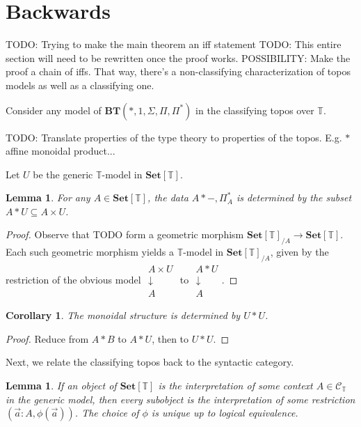 \documentclass{article}
\newtheorem{lemma}[theorem]{Lemma}
\newtheorem{corollary}[theorem]{Corollary}
\newcommand*{\Set}{\mathbf{Set}}
\newcommand*{\C}{\mathcal{C}}
\newcommand*{\T}{\mathbb{T}}
\begin{document}
\section{Backwards}

TODO: Trying to make the main theorem an iff statement
TODO: This entire section will need to be rewritten once the proof works.
POSSIBILITY: Make the proof a chain of iffs. That way, there's a non-classifying characterization of topos models as well as a classifying one.

Consider any model of \(\mathbf{BT}(*, 1, \Sigma, \Pi, \Pi^*)\) in the classifying topos over \(\T\).

TODO: Translate properties of the type theory to properties of the topos. E.g. \(*\) affine monoidal product...

Let \(U\) be the generic \(\T\)-model in \(\Set[\T]\).

\begin{lemma}
    For any \(A \in \Set[\T]\), the data \(A * -, \Pi^*_A\) is determined by the subset \(A * U \subseteq A \times U\).
\end{lemma}

\begin{proof}
    Observe that TODO form a geometric morphism \(\Set[\T]_{/A} \to \Set[\T]\).
    Each such geometric morphism yields a \(\T\)-model in \(\Set[\T]_{/A}\),
    given by the restriction of the obvious model \(\substack{A \times U \\ \downarrow \\ A}\) to \(\substack{A * U \\ \downarrow \\ A}\).
\end{proof}

\begin{corollary}
    The monoidal structure is determined by \(U * U\).
\end{corollary}

\begin{proof}
    Reduce from \(A*B\) to \(A*U\), then to \(U*U\).
\end{proof}

Next, we relate the classifying topos back to the syntactic category.

\begin{lemma}
    If an object of \(\Set[\T]\) is the interpretation of some context \(A \in \C_\T\) in the generic model,
    then every subobject is the interpretation of some restriction \((\vec{a} : A, \phi(\vec{a}))\).
    The choice of \(\phi\) is unique up to logical equivalence.
\end{lemma}
\end{document}
